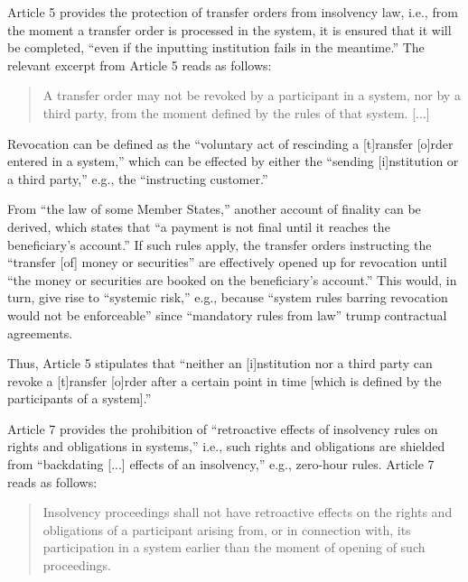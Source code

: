 Article 5 provides the protection of transfer orders from insolvency law, i.e., from the moment a transfer order is processed in the system, it is ensured that it will be completed, ``even if the inputting institution fails in the meantime.'' \autocite[19]{cpmi2001}
The relevant excerpt from Article 5 reads as follows: \autocite{eu1998sfd}

\begin{quote}
	A transfer order may not be revoked by a participant in a system, nor by a third party, from the moment defined by the rules of that system. [...]
\end{quote}

Revocation can be defined as the ``voluntary act of rescinding a [t]ransfer [o]rder entered in a system,'' which can be effected by either the ``sending [i]nstitution or a third party,'' e.g., the ``instructing customer.'' \autocite[51]{vereecken2003}

From ``the law of some Member States,'' another account of finality can be derived, which states that ``a payment is not final until it reaches the beneficiary's account.'' \autocite[52]{vereecken2003}
If such rules apply, the transfer orders instructing the ``transfer [of] money or securities'' are effectively opened up for revocation until ``the money or securities are booked on the beneficiary's account.'' \autocite[52]{vereecken2003}
This would, in turn, give rise to ``systemic risk,'' e.g., because ``system rules barring revocation would not be enforceable'' since ``mandatory rules from law'' trump contractual agreements. \autocite[52]{vereecken2003}

Thus, Article 5 stipulates that ``neither an [i]nstitution nor a third party can revoke a [t]ransfer [o]rder after a certain point in time [which is defined by the participants of a system].'' \autocite[52]{vereecken2003}

Article 7 provides the prohibition of ``retroactive effects of insolvency rules on rights and obligations in systems,'' i.e., such rights and obligations are shielded from ``backdating [...] effects of an insolvency,'' e.g., zero-hour rules. \autocite[19]{cpmi2001}
Article 7 reads as follows: \autocite{eu1998sfd}

\begin{quote}
	Insolvency proceedings shall not have retroactive effects on the rights and obligations of a participant arising from, or in connection with, its participation in a system earlier than the moment of opening of such proceedings.
\end{quote}

